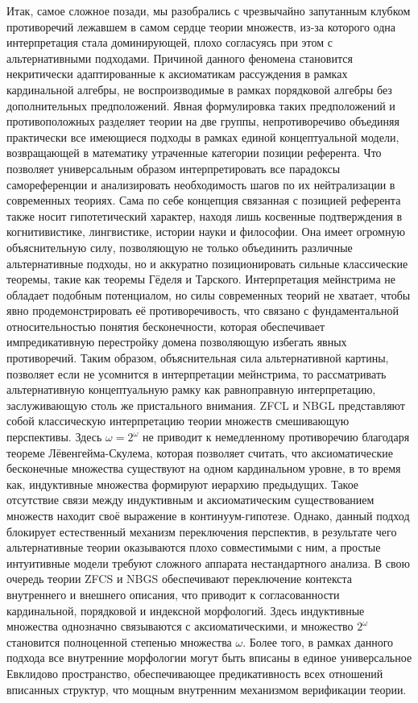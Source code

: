 \documentclass[12pt]{article}
\begin{document}
Итак, самое сложное позади, мы разобрались с чрезвычайно запутанным клубком противоречий лежавшем в самом сердце теории множеств, из-за которого одна интерпретация стала доминирующей, плохо согласуясь при этом с альтернативными подходами. Причиной данного феномена становится некритически адаптированные к аксиоматикам рассуждения в рамках кардинальной алгебры, не воспроизводимые в рамках порядковой алгебры без дополнительных предположений. Явная формулировка таких предположений и противоположных разделяет теории на две группы, непротиворечиво объединяя практически все имеющиеся подходы в рамках единой концептуальной модели, возвращающей в математику утраченные категории позиции референта. Что позволяет универсальным образом интерпретировать все парадоксы самореференции и анализировать необходимость шагов по их нейтрализации в современных теориях. Сама по себе концепция связанная с позицией референта также носит гипотетический характер, находя лишь косвенные подтверждения в когнитивистике, лингвистике, истории науки и философии. Она имеет огромную объяснительную силу, позволяющую не только объединить различные альтернативные подходы, но и аккуратно позиционировать сильные классические теоремы, такие как теоремы Гёделя и Тарского. Интерпретация мейнстрима не обладает подобным потенциалом, но силы современных теорий не хватает, чтобы явно продемонстрировать её противоречивость, что связано с фундаментальной относительностью понятия бесконечности, которая обеспечивает импредикативную перестройку домена позволяющую избегать явных противоречий. Таким образом, объяснительная сила альтернативной картины, позволяет если не усомнится в интерпретации мейнстрима, то рассматривать альтернативную концептуальную рамку как равноправную интерпретацию, заслуживающую столь же пристального внимания. ZFCL и NBGL представляют собой классическую интерпретацию теории множеств смешивающую перспективы. Здесь $\omega = 2^{\omega}$ не приводит к немедленному противоречию благодаря теореме Лёвенгейма-Скулема, которая позволяет считать, что аксиоматические бесконечные множества существуют на одном кардинальном уровне, в то время как, индуктивные множества формируют иерархию предыдущих. Такое отсутствие связи между индуктивным и аксиоматическим существованием множеств находит своё выражение в континуум-гипотезе. Однако, данный подход блокирует естественный механизм переключения перспектив, в результате чего альтернативные теории оказываются плохо совместимыми с ним, а простые интуитивные модели требуют сложного аппарата нестандартного анализа. В свою очередь теории ZFCS и NBGS обеспечивают переключение контекста внутреннего и внешнего описания, что приводит к согласованности кардинальной, порядковой и индексной морфологий. Здесь индуктивные множества однозначно связываются с аксиоматическими, и множество $2^{\omega}$ становится полноценной степенью множества $\omega$. Более того, в рамках данного подхода все внутренние морфологии могут быть вписаны в единое универсальное Евклидово пространство, обеспечивающее предикативность всех отношений вписанных структур, что мощным внутренним механизмом верификации теории. 
\end{document}
